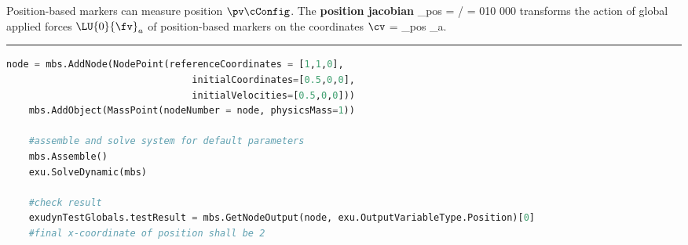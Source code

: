     Position-based markers can measure position $\pv\cConfig$. The {\bf position jacobian}  
    \be
      \Jm_{pos} = \partial \pv\cCur / \partial \cv\cCur =  {0}{1}{0} {0}{0}{0}
    \ee
    transforms the action of global applied forces $\LU{0}{\fv}_a$ of position-based markers on the coordinates $\cv$
    \be
      \Qm = \Jm_{pos} _a.
    \ee
\vspace{6pt}\par\noindent\rule{\textwidth}{0.4pt}
\label{miniExample_ObjectMassPoint}
\pythonstyle
\begin{lstlisting}[language=Python, firstnumber=1]
    node = mbs.AddNode(NodePoint(referenceCoordinates = [1,1,0], 
                                 initialCoordinates=[0.5,0,0],
                                 initialVelocities=[0.5,0,0]))
    mbs.AddObject(MassPoint(nodeNumber = node, physicsMass=1))

    #assemble and solve system for default parameters
    mbs.Assemble()
    exu.SolveDynamic(mbs)

    #check result
    exudynTestGlobals.testResult = mbs.GetNodeOutput(node, exu.OutputVariableType.Position)[0]
    #final x-coordinate of position shall be 2
\end{lstlisting}

